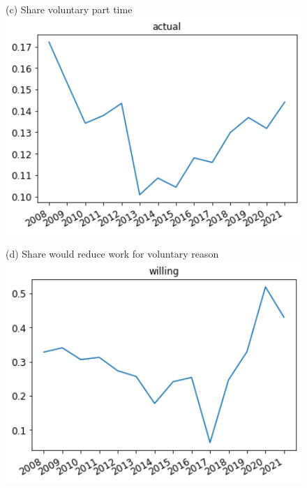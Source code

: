 \documentclass[12pt]{article}
\begin{document}
\begin{figure}[h!!]
\begin{minipage}[h!!]{0.4\textwidth}
	\end{minipage}
	\begin{minipage}[h!!]{0.4\textwidth}  
	\centering\footnotesize{(c) Share voluntary part time}
	\includegraphics[width=1\textwidth]{../codding_data/results/liss/total_share_voluntary_work_reduction_actual.png}
\end{minipage}
\begin{minipage}[h!!]{0.4\textwidth}
	\centering\footnotesize{(d) Share would reduce work for voluntary reason}
	\includegraphics[width=1\textwidth]{../codding_data/results/liss/total_share_voluntary_work_reduction_willing.png}
\end{minipage}
\end{figure}
\end{document}
